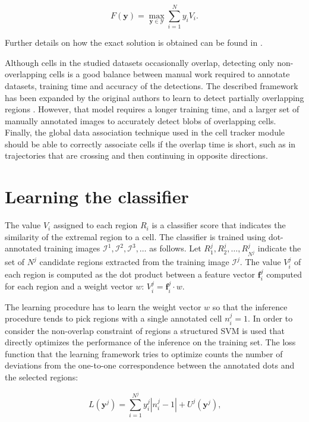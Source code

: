 	\[
		F(\textbf{y}) = \max_{\textbf{y} \in \mathcal{Y}} \sum_{i=1}^N y_i V_i \text{.}
	\]
	
	Further details on how the exact solution is obtained can be found in \cite{arteta12}.
	
	Although cells in the studied datasets occasionally overlap, detecting only non-overlapping cells is a good balance between manual work required to annotate datasets, training time and accuracy of the detections. The described framework has been expanded by the original authors to learn to detect partially overlapping regions \cite{arteta13}. However, that model requires a longer training time, and a larger set of manually annotated images to accurately detect blobs of overlapping cells. Finally, the global data association technique used in the cell tracker module should be able to correctly associate cells if the overlap time is short, such as in trajectories that are crossing and then continuing in opposite directions.
	
	
	\section{Learning the classifier \statusfirstdraft}
	\label{sec:detector_classifier}
	
	The value $V_i$ assigned to each region $R_i$ is a classifier score that indicates the similarity of the extremal region to a cell. The classifier is trained using dot-annotated training images $\mathcal{I}^1, \mathcal{I}^2, \mathcal{I}^3, \dots$ as follows. Let $R_1^j, R_2^j,\dots,R_{N^j}^j$ indicate the set of $N^j$ candidate regions extracted from the training image $\mathcal{I}^j$. The value $V_i^j$ of each region is computed as the dot product between a feature vector $\textbf{f}_i^j$ computed for each region and a weight vector $w$: $V_i^j = \textbf{f}_i^j \cdot w$.
	
	The learning procedure has to learn the weight vector $w$ so that the inference procedure tends to pick regions with a single annotated cell $n_i^j = 1$. In order to consider the non-overlap constraint of regions a structured SVM \cite{tso04} is used that directly optimizes the performance of the inference on the training set. The loss function that the learning framework tries to optimize counts the number of deviations from the one-to-one correspondence between the annotated dots and the selected regions:
	
	\[
		L(\textbf{y}^j) = \sum_{i=1}^{N^j} y_i^j |n_i^j - 1| + U^j(\textbf{y}^j)\text{,}
	\]
	
